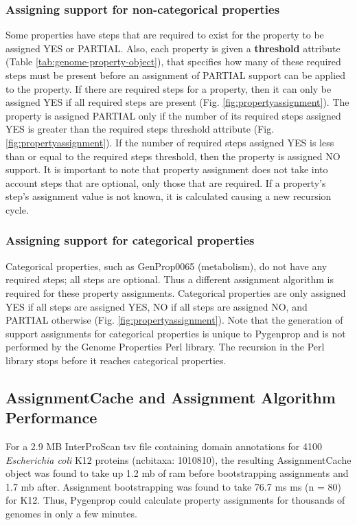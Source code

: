 \subsubsection{Assigning support for non-categorical properties}

Some properties have steps that are required to exist for the property to be assigned YES or PARTIAL. Also, each property is given a \textbf{threshold} attribute (Table \ref{tab:genome-property-object}), that specifies how many of these required steps must be present before an assignment of PARTIAL support can be applied to the property. If there are required steps for a property, then it can only be assigned YES if all required steps are present (Fig. \ref{fig:propertyassignment}). The property is assigned PARTIAL only if the number of its required steps assigned YES is greater than the required steps threshold attribute (Fig. \ref{fig:propertyassignment}). If the number of required steps assigned YES is less than or equal to the required steps threshold, then the property is assigned NO support. It is important to note that property assignment does not take into account steps that are optional, only those that are required. If a property's step's assignment value is not known, it is calculated causing a new recursion cycle.

\subsubsection{Assigning support for categorical properties}

Categorical properties, such as GenProp0065 (metabolism), do not have any required steps; all steps are optional. Thus a different assignment algorithm is required for these property assignments. Categorical properties are only assigned YES if all steps are assigned YES, NO if all steps are assigned NO, and PARTIAL otherwise (Fig. \ref{fig:propertyassignment}). Note that the generation of support assignments for categorical properties is unique to Pygenprop and is not performed by the Genome Properties Perl library. The recursion in the Perl library stops before it reaches categorical properties.

\subsection{AssignmentCache and Assignment Algorithm Performance} \label{AssignmentCache-Performance}

For a 2.9 MB InterProScan \gls{tsv} file containing domain annotations for 4100 \textit{Escherichia coli} K12 proteins (\gls{ncbitaxa}: 1010810), the resulting AssignmentCache object was found to take up 1.2 \gls{mb} of \gls{ram} before bootstrapping assignments and 1.7 \gls{mb} after. Assignment bootstrapping was found to take 76.7 ms  ms (\gls{n} = 80) for K12. Thus, Pygenprop could calculate property assignments for thousands of genomes in only a few minutes.

